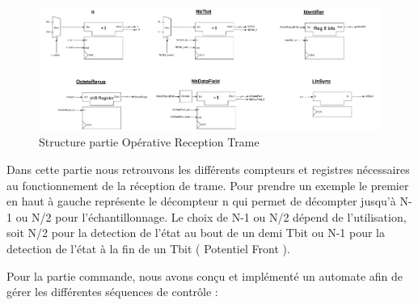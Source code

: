 \begin{figure}[H]
    \centering
    \includegraphics[width=0.95\linewidth]{images/inter/Structure_Reception_trame.pdf}
    \caption{Structure partie Opérative Reception Trame}
    \label{fig:placeholder}
\end{figure}

Dans cette partie nous retrouvons les différents compteurs et registres nécessaires au fonctionnement 
de la réception de trame. Pour prendre un exemple le premier en haut à gauche représente le 
décompteur n qui permet de décompter jusqu'à N-1 ou N/2 pour l'échantillonnage. 
Le choix de N-1 ou N/2 dépend de l'utilisation, soit N/2 pour la detection de l'état au bout de 
un demi Tbit ou N-1 pour la detection de l'état à la fin de un Tbit ( Potentiel Front ).


Pour la partie commande, nous avons conçu et implémenté un automate afin de gérer les différentes 
séquences de contrôle : 


